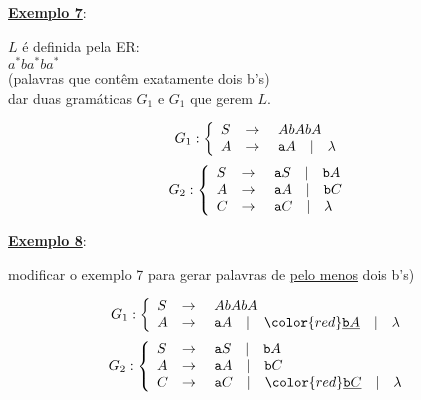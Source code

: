 \vspace{1cm}
\textbf{\underline{Exemplo 7}}:\\

\begin{center}
$L$ é definida pela ER: \\
$ a^{*}ba^{*}ba^{*} $ \\ (palavras que contêm exatamente dois b's) \\
dar duas gramáticas $G_1$ e $G_1$ que gerem $L$.\\
  \makebox[\linewidth]{\rule{\paperwidth/2}{0.4pt}}
\end{center}
{\color{blue}
\begin{flushleft}
   \[
      G_1:\left\{
      \begin{array}{l c l}
        S & \rightarrow & \ AbAbA \\
        A & \rightarrow & \ \texttt{a}A \quad | \quad \lambda  \\
      \end{array}
      \right.\] \[
      G_2:\left\{
      \begin{array}{l c l}
        S & \rightarrow & \ \texttt{a}S \quad | \quad \texttt{b}A \\
	A & \rightarrow & \ \texttt{a}A \quad | \quad \texttt{b}C  \\
	C & \rightarrow & \ \texttt{a}C \quad | \quad \lambda  \\
      \end{array}
      \right.
  \]
\end{flushleft}
}

\vspace{1cm}
\textbf{\underline{Exemplo 8}}:\\

\begin{center}
modificar o exemplo 7 para gerar palavras de {\color{red}\underline{pelo menos}} dois b's) \\
  \makebox[\linewidth]{\rule{\paperwidth/2}{0.4pt}}
\end{center}
{\color{blue}
\begin{flushleft}
   \[
      G_1:\left\{
      \begin{array}{l c l}
        S & \rightarrow & \ AbAbA \\
        A & \rightarrow & \ \texttt{a}A \quad | \quad {\color{red}\underline{ \texttt{b}A}} \quad | \quad \lambda  \\
      \end{array}
      \right.\] \[
      G_2:\left\{
      \begin{array}{l c l}
        S & \rightarrow & \ \texttt{a}S \quad | \quad \texttt{b}A \\
	A & \rightarrow & \ \texttt{a}A \quad | \quad \texttt{b}C  \\
	C & \rightarrow & \ \texttt{a}C \quad | \quad {\color{red}\underline{ \texttt{b}C}} \quad | \quad \lambda  \\
      \end{array}
      \right.
  \]
\end{flushleft}
}

